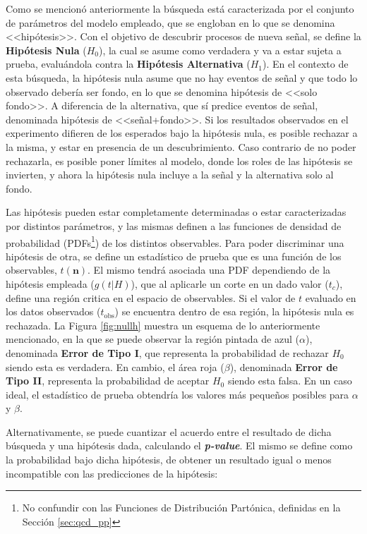 Como se mencionó anteriormente la búsqueda está caracterizada por el conjunto de parámetros del modelo empleado, que se engloban en lo que se denomina <<hipótesis>>. Con el objetivo de descubrir procesos de nueva señal, se define la \textbf{Hipótesis Nula} ($H_0$), la cual se asume como verdadera y va a estar sujeta a prueba, evaluándola contra la \textbf{Hipótesis Alternativa} ($H_1$). En el contexto de esta búsqueda, la hipótesis nula asume que no hay eventos de señal y que todo lo observado debería ser fondo, en lo que se denomina hipótesis de <<solo fondo>>. A diferencia de la alternativa, que sí predice eventos de señal, denominada hipótesis de <<señal+fondo>>. Si los resultados observados en el experimento difieren de los esperados bajo la hipótesis nula, es posible rechazar a la misma, y estar en presencia de un descubrimiento. Caso contrario de no poder rechazarla, es posible poner límites al modelo, donde los roles de las hipótesis se invierten, y ahora la hipótesis nula incluye a la señal y la alternativa solo al fondo.

Las hipótesis pueden estar completamente determinadas o estar caracterizadas por distintos parámetros, y las mismas definen a las funciones de densidad de probabilidad (PDFs\footnote{No confundir con las Funciones de Distribución Partónica, definidas en la Sección \ref{sec:qcd_pp}}) de los distintos observables. Para poder discriminar una hipótesis de otra, se define un estadístico de prueba que es una función de los observables, $t(\textbf{n})$. El mismo tendrá asociada una PDF dependiendo de la hipótesis empleada ($g(t|H)$), que al aplicarle un corte en un dado valor ($t_c$), define una región critica en el espacio de observables. Si el valor de $t$ evaluado en los datos observados ($t_{\text{obs}}$) se encuentra dentro de esa región, la hipótesis nula es rechazada. La Figura \ref{fig:nullh} muestra un esquema de lo anteriormente mencionado, en la que se puede observar la región pintada de azul ($\alpha$), denominada \textbf{Error de Tipo I}, que representa la probabilidad de rechazar $H_0$ siendo esta es verdadera. En cambio, el área roja ($\beta$), denominada \textbf{Error de Tipo II}, representa la probabilidad de aceptar $H_0$ siendo esta falsa. En un caso ideal, el estadístico de prueba obtendría los valores más pequeños posibles para $\alpha$ y $\beta$.



Alternativamente, se puede cuantizar el acuerdo entre el resultado de dicha búsqueda y una hipótesis dada, calculando el \textbf{\textit{p-value}}. El mismo se define como la probabilidad bajo dicha hipótesis, de obtener un resultado igual o menos incompatible con las predicciones de la hipótesis:



